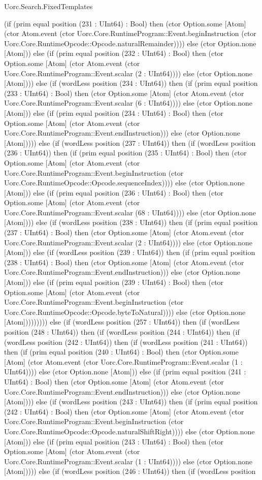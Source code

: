\begin{lexlean}{Uorc.Search.FixedTemplates}
\begin{semanticmodule}
{(if (prim equal position (231 : UInt64) : Bool) then (ctor Option.some [Atom] (ctor Atom.event (ctor Uorc.Core.RuntimeProgram::Event.beginInstruction (ctor Uorc.Core.RuntimeOpcode::Opcode.naturalRemainder)))) else (ctor Option.none [Atom])) else (if (prim equal position (232 : UInt64) : Bool) then (ctor Option.some [Atom] (ctor Atom.event (ctor Uorc.Core.RuntimeProgram::Event.scalar (2 : UInt64)))) else (ctor Option.none [Atom]))) else (if (wordLess position (234 : UInt64)) then (if (prim equal position (233 : UInt64) : Bool) then (ctor Option.some [Atom] (ctor Atom.event (ctor Uorc.Core.RuntimeProgram::Event.scalar (6 : UInt64)))) else (ctor Option.none [Atom])) else (if (prim equal position (234 : UInt64) : Bool) then (ctor Option.some [Atom] (ctor Atom.event (ctor Uorc.Core.RuntimeProgram::Event.endInstruction))) else (ctor Option.none [Atom])))) else (if (wordLess position (237 : UInt64)) then (if (wordLess position (236 : UInt64)) then (if (prim equal position (235 : UInt64) : Bool) then (ctor Option.some [Atom] (ctor Atom.event (ctor Uorc.Core.RuntimeProgram::Event.beginInstruction (ctor Uorc.Core.RuntimeOpcode::Opcode.sequenceIndex)))) else (ctor Option.none [Atom])) else (if (prim equal position (236 : UInt64) : Bool) then (ctor Option.some [Atom] (ctor Atom.event (ctor Uorc.Core.RuntimeProgram::Event.scalar (68 : UInt64)))) else (ctor Option.none [Atom]))) else (if (wordLess position (238 : UInt64)) then (if (prim equal position (237 : UInt64) : Bool) then (ctor Option.some [Atom] (ctor Atom.event (ctor Uorc.Core.RuntimeProgram::Event.scalar (2 : UInt64)))) else (ctor Option.none [Atom])) else (if (wordLess position (239 : UInt64)) then (if (prim equal position (238 : UInt64) : Bool) then (ctor Option.some [Atom] (ctor Atom.event (ctor Uorc.Core.RuntimeProgram::Event.endInstruction))) else (ctor Option.none [Atom])) else (if (prim equal position (239 : UInt64) : Bool) then (ctor Option.some [Atom] (ctor Atom.event (ctor Uorc.Core.RuntimeProgram::Event.beginInstruction (ctor Uorc.Core.RuntimeOpcode::Opcode.byteToNatural)))) else (ctor Option.none [Atom])))))))) else (if (wordLess position (257 : UInt64)) then (if (wordLess position (248 : UInt64)) then (if (wordLess position (244 : UInt64)) then (if (wordLess position (242 : UInt64)) then (if (wordLess position (241 : UInt64)) then (if (prim equal position (240 : UInt64) : Bool) then (ctor Option.some [Atom] (ctor Atom.event (ctor Uorc.Core.RuntimeProgram::Event.scalar (1 : UInt64)))) else (ctor Option.none [Atom])) else (if (prim equal position (241 : UInt64) : Bool) then (ctor Option.some [Atom] (ctor Atom.event (ctor Uorc.Core.RuntimeProgram::Event.endInstruction))) else (ctor Option.none [Atom]))) else (if (wordLess position (243 : UInt64)) then (if (prim equal position (242 : UInt64) : Bool) then (ctor Option.some [Atom] (ctor Atom.event (ctor Uorc.Core.RuntimeProgram::Event.beginInstruction (ctor Uorc.Core.RuntimeOpcode::Opcode.naturalShiftRight)))) else (ctor Option.none [Atom])) else (if (prim equal position (243 : UInt64) : Bool) then (ctor Option.some [Atom] (ctor Atom.event (ctor Uorc.Core.RuntimeProgram::Event.scalar (1 : UInt64)))) else (ctor Option.none [Atom])))) else (if (wordLess position (246 : UInt64)) then (if (wordLess position }
\end{semanticmodule}
\end{lexlean}
